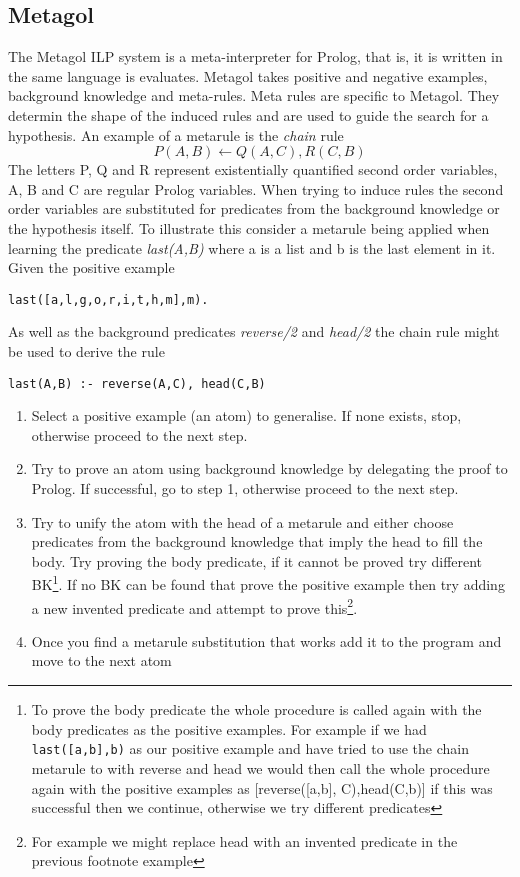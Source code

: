 \subsection{Metagol}
The Metagol ILP system is a meta-interpreter for Prolog, that is, it is written in the same language is evaluates\cite{Cropper/Thesis,Rolf/Metagol,Metagol/Github}. Metagol takes positive and negative examples, background knowledge and meta-rules. Meta rules are specific to Metagol. They determin the shape of the induced rules and are used to guide the search for a hypothesis. An example of a metarule is the \textit{chain} rule \[P(A,B) \leftarrow Q(A,C),R(C,B)\] The letters P, Q and R represent existentially quantified second order variables, A, B and C are regular Prolog variables. When trying to induce rules the second order variables are substituted for predicates from the background knowledge or the hypothesis itself. To illustrate this consider a metarule being applied when learning the predicate \textit{last(A,B)} where a is a list and b is the last element in it. Given the positive example
\begin{verbatim}
last([a,l,g,o,r,i,t,h,m],m).
\end{verbatim}

As well as the background predicates \textit{reverse/2} and \textit{head/2} the chain rule might be used to derive the rule
\begin{verbatim}
last(A,B) :- reverse(A,C), head(C,B)
\end{verbatim}

\begin{enumerate}
\item Select a positive example (an atom) to generalise. If none exists, stop, otherwise proceed to the next step.
\item Try to prove an atom using background knowledge by delegating the proof to Prolog. If successful, go to step 1, otherwise proceed to the next step.
\item Try to unify the atom with the head of a metarule and either choose predicates from the background knowledge that imply the head to fill the body. Try proving the body predicate, if it cannot be proved try different BK\footnote{To prove the body predicate the whole procedure is called again with the body predicates as the positive examples. For example if we had \texttt{last([a,b],b)} as our positive example and have tried to use the chain metarule to with reverse and head we would then call the whole procedure again with the positive examples as [reverse([a,b], C),head(C,b)] if this was successful then we continue, otherwise we try different predicates}. If no BK can be found that prove the positive example then try adding a new invented predicate and attempt to prove this\footnote{For example we might replace head with an invented predicate in the previous footnote example}.
\item Once you find a metarule substitution that works add it to the program and move to the next atom
\end{enumerate}


